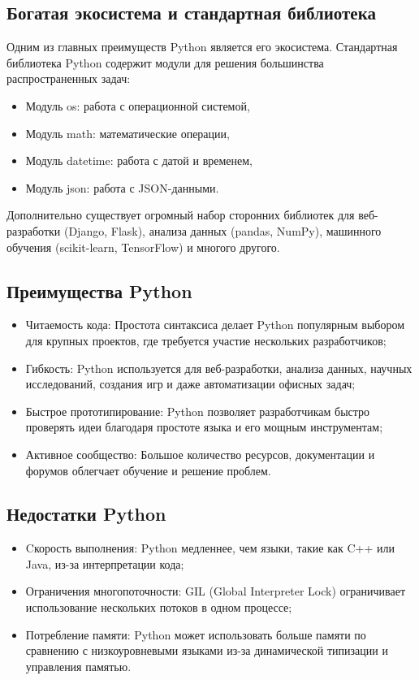 \subsection*{Богатая экосистема и стандартная библиотека}

Одним из главных преимуществ Python является его экосистема. Стандартная библиотека Python содержит модули для решения большинства распространенных задач:
\begin{itemize}
    \item Модуль os: работа с операционной системой,
    \item Модуль math: математические операции,
    \item Модуль datetime: работа с датой и временем,
    \item Модуль json: работа с JSON-данными.
\end{itemize}

Дополнительно существует огромный набор сторонних библиотек для веб-разработки (Django, Flask), анализа данных (pandas, NumPy), машинного обучения (scikit-learn, TensorFlow) и многого другого.

\subsection*{Преимущества Python}
\begin{itemize}
    \item Читаемость кода: Простота синтаксиса делает Python популярным выбором для крупных проектов, где требуется участие нескольких разработчиков;
    \item Гибкость: Python используется для веб-разработки, анализа данных, научных исследований, создания игр и даже автоматизации офисных задач;
    \item Быстрое прототипирование: Python позволяет разработчикам быстро проверять идеи благодаря простоте языка и его мощным инструментам;
    \item Активное сообщество: Большое количество ресурсов, документации и форумов облегчает обучение и решение проблем.
\end{itemize}

\subsection*{Недостатки Python}
\begin{itemize}
    \item Cкорость выполнения: Python медленнее, чем языки, такие как C++ или Java, из-за интерпретации кода;
    \item Ограничения многопоточности: GIL (Global Interpreter Lock) ограничивает использование нескольких потоков в одном процессе;
    \item Потребление памяти: Python может использовать больше памяти по сравнению с низкоуровневыми языками из-за динамической типизации и управления памятью.
\end{itemize}

